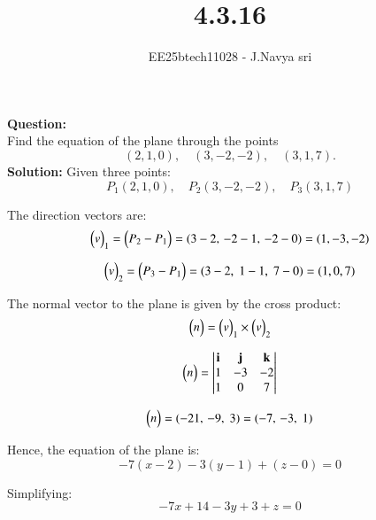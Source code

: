 \documentclass[journal]{IEEEtran}
\begin{document}

\vspace{3cm}

\title{4.3.16}
\author{EE25btech11028 - J.Navya sri}
{\let\newpage\relax\maketitle}


\textbf{Question:} \\
Find the equation of the plane through the points  
\[
(2,1,0), \quad (3,-2,-2), \quad (3,1,7).
\]
\textbf{Solution:}
Given three points:
\[
P_1(2,1,0), \quad P_2(3,-2,-2), \quad P_3(3,1,7)
\]

The direction vectors are:
\begin{equation}
\begin{pmatrix}v\end{pmatrix}_1 =\begin{pmatrix}P_2 - P_1\end{pmatrix} = (3-2,\,-2-1,\,-2-0) = (1,-3,-2)
\end{equation}

\begin{equation}
\begin{pmatrix}v\end{pmatrix}_2 =\begin{pmatrix}P_3 - P_1 \end{pmatrix}= (3-2,\;1-1,\;7-0) = (1,0,7)
\end{equation}

The normal vector to the plane is given by the cross product:
\begin{equation}
\begin{pmatrix}n\end{pmatrix} = \begin{pmatrix}v\end{pmatrix}_1 \times \begin{pmatrix}v\end{pmatrix}_2
\end{equation}

\begin{equation}
\begin{pmatrix}n\end{pmatrix} = 
\begin{vmatrix}
\mathbf{i} & \mathbf{j} & \mathbf{k} \\
1 & -3 & -2 \\
1 & 0 & 7
\end{vmatrix}
\end{equation}

\begin{equation}
\begin{pmatrix}n\end{pmatrix} = (-21,\,-9,\;3) = (-7,\,-3,\;1)
\end{equation}

Hence, the equation of the plane is:
\begin{equation}
-7(x-2) - 3(y-1) + (z-0) = 0
\end{equation}

Simplifying:
\begin{equation}
-7x + 14 - 3y + 3 + z = 0
\end{equation}
\end{document}
